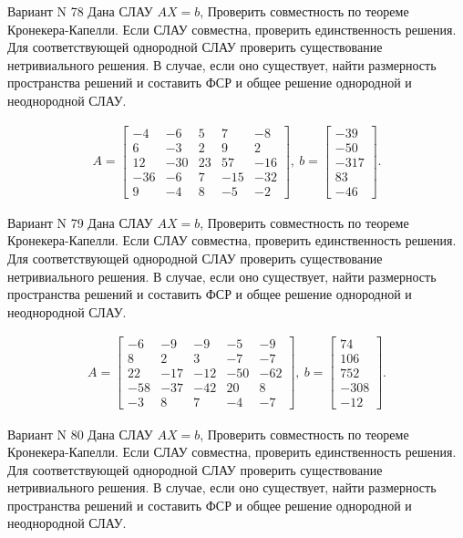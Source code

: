 \documentclass[11pt]{report}
\begin{document}
Вариант N 78
Дана СЛАУ $AX = b$,
Проверить совместность по теореме Кронекера-Капелли. Если СЛАУ совместна, проверить единственность решения.
Для соответствующей однородной СЛАУ проверить существование нетривиального решения. В случае, если оно существует,
найти размерность пространства решений и составить ФСР и общее решение однородной  и неоднородной СЛАУ.


\begin{align*}
 A = \left[\begin{matrix}-4 & -6 & 5 & 7 & -8\\6 & -3 & 2 & 9 & 2\\12 & -30 & 23 & 57 & -16\\-36 & -6 & 7 & -15 & -32\\9 & -4 & 8 & -5 & -2\end{matrix}\right],
\ b = \left[\begin{matrix}-39\\-50\\-317\\83\\-46\end{matrix}\right]. 
 \end{align*}

Вариант N 79
Дана СЛАУ $AX = b$,
Проверить совместность по теореме Кронекера-Капелли. Если СЛАУ совместна, проверить единственность решения.
Для соответствующей однородной СЛАУ проверить существование нетривиального решения. В случае, если оно существует,
найти размерность пространства решений и составить ФСР и общее решение однородной  и неоднородной СЛАУ.


\begin{align*}
 A = \left[\begin{matrix}-6 & -9 & -9 & -5 & -9\\8 & 2 & 3 & -7 & -7\\22 & -17 & -12 & -50 & -62\\-58 & -37 & -42 & 20 & 8\\-3 & 8 & 7 & -4 & -7\end{matrix}\right],
\ b = \left[\begin{matrix}74\\106\\752\\-308\\-12\end{matrix}\right]. 
 \end{align*}

Вариант N 80
Дана СЛАУ $AX = b$,
Проверить совместность по теореме Кронекера-Капелли. Если СЛАУ совместна, проверить единственность решения.
Для соответствующей однородной СЛАУ проверить существование нетривиального решения. В случае, если оно существует,
найти размерность пространства решений и составить ФСР и общее решение однородной  и неоднородной СЛАУ.
\end{document}
